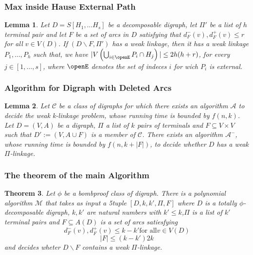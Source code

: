 \documentclass{beamer}
\newtheorem{thm}{Theorem}[section]
\newtheorem{lemma}[thm]{Lemma}
\begin{document}
\begin{frame}
    \frametitle{Max inside Hause External Path}
    \begin{lemma}
        Let $D=S[H_1,\dots H_s]$ be a decomposable digraph, let $\Pi'$ be a list of $h$ terminal pair and let $F$ be a set of arcs in $D$ satisfying that $d^-_F(v),d^+_F(v) \leq r$ for all $v \in V(D)$. If $(D\backslash F,\Pi')$ has a weak linkage, then it has a weak linkage $P_1,\dots , P_h$ such that, we have $|V\left( \bigcup_{i\in \openE} P_i\cap H_j \right)|\leq 2h(h+r)$, for every $j\in [1,\dots,s]$, where $\openE$ denotes the set of indeces $i$ for wich $P_i$ is external.
    \end{lemma}
\end{frame}
\begin{frame}
    \frametitle{Algorithm for Digraph with Deleted Arcs}
    \begin{lemma}
        Let $\mathcal{C}$ be a class of digraphs for which there exists an algorithm $\mathcal{A}$ to decide the weak k-linkage problem, whose running time is bounded by $f(n,k)$. Let $D=(V,A)$ be a digraph, $\Pi$ a list of $k$ pairs of terminals and $F\subseteq V\times V$ such that $D':= (V,A\cup F)$ is a member of $\mathcal{C}$. There exists an algorithm  $\mathcal{A}^-$, whose running time is bounded by $f(n,k+|F|)$, to decide whether $D$ has a weak $\Pi$-linkage.
    \end{lemma}
\end{frame}
\begin{frame}
    \frametitle{The theorem of the main Algorithm}
    \begin{thm}
        Let $\phi$ be a bombproof class of digraph. There is a polynomial algorithm $\mathcal{M}$ that takes as input a 5tuple $[D,k,k',\Pi,F]$ where $D$ is a totally $\phi$-decomposable digraph, $k,k'$ are natural numbers with $k'\leq k$,$\Pi$ is a list of $k'$ terminal pairs and $F\subseteq A(D)$ is a set of arcs satiesfying 
        \begin{equation}
            d_F^-(v),d_F^+(v)\leq k-k' \text{for all} v\in V(D)
        \end{equation}
        \begin{equation*}
            |F|\leq (k-k')2k
        \end{equation*}
        and decides wheter $D\backslash F$ contains a weak $\Pi$-linkage.
    \end{thm}
\end{frame}
\end{document}

